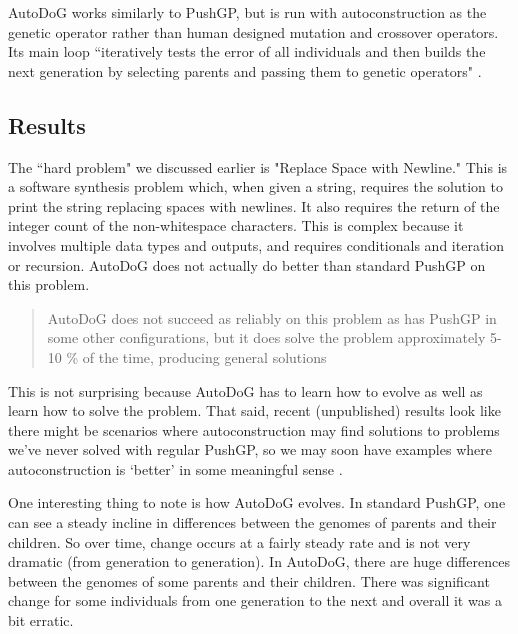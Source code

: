 \documentclass{sig-alternate}
\begin{document}
AutoDoG works similarly to PushGP, but is run with autoconstruction as the genetic operator rather than human designed mutation and crossover operators. Its main loop ``iteratively tests the error of all individuals and then builds the next generation by selecting parents and passing them to genetic operators" \cite{spector:2016}.


\subsection{Results}
\label{sec:results}
The ``hard problem" we discussed earlier is "Replace Space with Newline." This is a software synthesis problem which, when given a string, requires the solution to print the string replacing spaces with newlines. It also requires the return of the integer count of the non-whitespace characters. This is complex because it involves multiple data types and outputs, and requires conditionals and iteration or recursion.
AutoDoG does not actually do better than standard PushGP on this problem.
\begin{quotation}
	AutoDoG does not succeed as reliably on this problem as has PushGP in some other configurations, but it does solve the problem approximately 5-10 \% of the time, producing general solutions \cite{spector:2016}
\end{quotation}

This is not surprising because AutoDoG has to learn how to evolve as well as learn how to solve the problem. That said, recent (unpublished) results look like there might be scenarios where autoconstruction may find solutions to problems we've never solved with regular PushGP, so we may soon have examples where autoconstruction is `better' in some meaningful sense \cite{Eva:autoconstruction}.


One interesting thing to note is how AutoDoG evolves. In standard PushGP, one can see a steady incline in differences between the genomes of parents and their children. So over time, change occurs at a fairly steady rate and is not very dramatic (from generation to generation). In AutoDoG, there are huge differences between the genomes of some parents and their children. There was significant change for some individuals from one generation to the next and overall it was a bit erratic.
\end{document}
